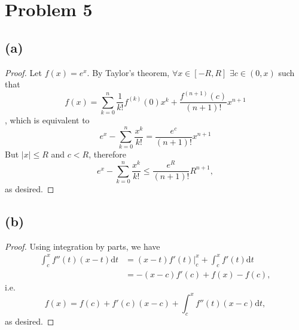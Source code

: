 \documentclass{article}
\begin{document}
\section*{Problem 5}
\subsection*{(a)}
\begin{proof}
	Let $f(x) = e^x$. By Taylor's theorem, $\forall x \in [-R, R]$ $\exists c \in (0, x)$ such that
	\begin{equation}
		f(x) = \sum_{k=0}^n \frac{1}{k!}f^{(k)}(0)x^k + \frac{f^{(n+1)}(c)}{(n+1)!}x^{n+1}
	\end{equation},
	which is equivalent to
	\begin{equation}
		e^x - \sum_{k=0}^n \frac{x^k}{k!} = \frac{e^c}{(n+1)!}x^{n+1}
	\end{equation}
	But $|x| \leq R$ and $c < R$, therefore
	\begin{equation}
		e^x - \sum_{k=0}^n \frac{x^k}{k!} \leq \frac{e^R}{(n+1)!}R^{n+1},
	\end{equation}
	as desired.
\end{proof}

\subsection*{(b)}
\begin{proof}
	Using integration by parts, we have
	\begin{align}
		\int_c ^x f''(t) (x - t) \mathrm{d}t &= (x - t) f'(t) \big|_c ^x + \int_c ^x f'(t) \mathrm{d}t \\
		&= -(x - c) f'(c) + f(x) - f(c),
	\end{align}
	i.e. 
	\begin{equation}
		f(x) = f(c) + f'(c) (x - c) + \int_c ^x f''(t) (x - c) \mathrm{d}t,
	\end{equation}
	as desired.
\end{proof}
\end{document}
